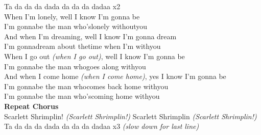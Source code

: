 Ta da da da dada da da da dadaa x2\\
When I’m lonely, well I know I’m gonna be\\
I’m gonnabe the man who’slonely withoutyou\\
And when I’m dreaming, well I know I’m gonna dream\\
I’m gonnadream about thetime when I’m withyou\\
When I go out \emph{(when I go out)}, well I know I’m gonna be\\
I’m gonnabe the man whogoes along withyou\\
And when I come home \emph{(when I come home)}, yes I know I’m gonna be\\
I’m gonnabe the man whocomes back home withyou\\
I’m gonnabe the man who’scoming home withyou\\
\textbf{Repeat Chorus}\\
Scarlett Shrimplin! \emph{(Scarlett Shrimplin!)} Scarlett Shrimplin \emph{(Scarlett Shrimplin!)}\\
Ta da da da dada da da da dadaa x3 \emph{(slow down for last line)}\\
